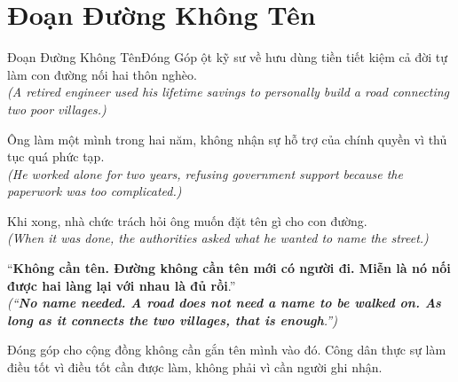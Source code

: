 \section{Đoạn Đường Không Tên}
\begin{truyen}{Đoạn Đường Không Tên}{Đóng Góp}
ột kỹ sư về hưu dùng tiền tiết kiệm cả đời tự làm con đường nối hai thôn nghèo.\\
\textit{(A retired engineer used his lifetime savings to personally build a road connecting two poor villages.)}

Ông làm một mình trong hai năm, không nhận sự hỗ trợ của chính quyền vì thủ tục quá phức tạp.\\
\textit{(He worked alone for two years, refusing government support because the paperwork was too complicated.)}

Khi xong, nhà chức trách hỏi ông muốn đặt tên gì cho con đường.\\
\textit{(When it was done, the authorities asked what he wanted to name the street.)}

``\textbf{Không cần tên. Đường không cần tên mới có người đi. Miễn là nó nối được hai làng lại với nhau là đủ rồi}.''\\
\textit{(``\textbf{No name needed. A road does not need a name to be walked on. As long as it connects the two villages, that is enough}.'')}
\end{truyen}
\begin{baihoc}
  Đóng góp cho cộng đồng không cần gắn tên mình vào đó. Công dân thực sự làm điều tốt vì điều tốt cần được làm, không phải vì cần người ghi nhận.
\end{baihoc}

